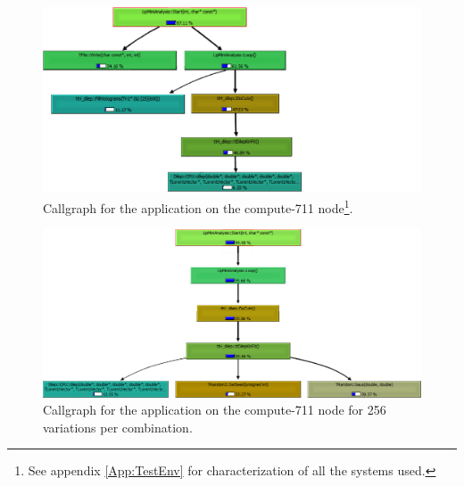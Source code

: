 \begin{figure}[!htp]
	\begin{center}
		\includegraphics[scale=0.5]{../../common/img/callgraph_start_1.png}
		\caption{Callgraph for the \tth application on the compute-711 node\footnote{See appendix \ref{App:TestEnv} for characterization of all the systems used.}.}
		\label{fig:Callgraph1}
	\end{center}
\end{figure}

\begin{figure}[!htp]
	\begin{center}
		\includegraphics[scale=0.5]{../../common/img/callgraph_start_256.png}
		\caption{Callgraph for the \tth application on the compute-711 node for 256 variations per combination.}
		\label{fig:Callgraph256}
	\end{center}
\end{figure}

